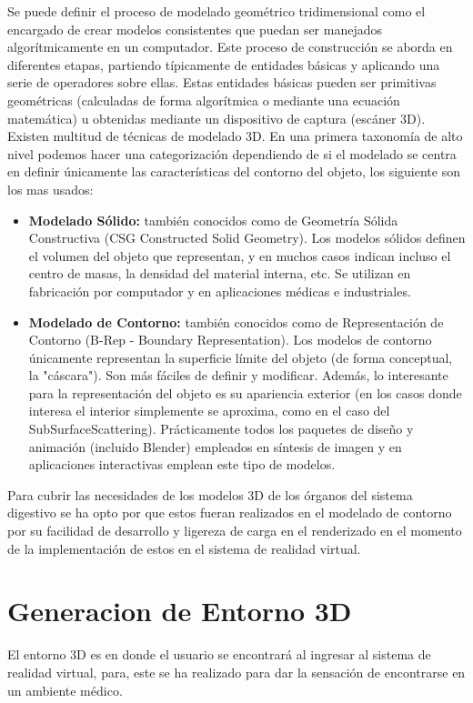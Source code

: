Se puede definir el proceso de modelado geométrico tridimensional como el encargado de crear modelos consistentes que puedan ser manejados algorítmicamente en un computador. Este proceso de construcción se aborda en diferentes etapas, partiendo típicamente de entidades básicas y aplicando una serie de operadores sobre ellas. Estas entidades básicas pueden ser primitivas geométricas (calculadas de forma algorítmica o mediante una ecuación matemática) u obtenidas mediante un dispositivo de captura (escáner 3D).\\

Existen multitud de técnicas de modelado 3D. En una primera taxonomía de alto nivel podemos hacer una categorización dependiendo de si el modelado se centra en definir únicamente las características del contorno del objeto, los siguiente son los mas usados:\\
\begin{itemize}
\item \textbf{Modelado Sólido:} también conocidos como de Geometría Sólida Constructiva (CSG Constructed Solid Geometry). Los modelos sólidos definen el volumen del objeto que representan, y en muchos casos indican incluso el centro de masas, la densidad del material interna, etc. Se utilizan en fabricación por computador y en aplicaciones médicas e industriales.
\item \textbf{Modelado de Contorno:} también conocidos como de Representación de Contorno (B-Rep - Boundary Representation). Los modelos de contorno únicamente representan la superficie límite del objeto (de forma conceptual, la "cáscara"). Son más fáciles de definir y modificar. Además, lo interesante para la representación del objeto es su apariencia exterior (en los casos donde interesa el interior simplemente se aproxima, como en el caso del SubSurfaceScattering). Prácticamente todos los paquetes de diseño y animación (incluido Blender) empleados en síntesis de imagen y en aplicaciones interactivas emplean este tipo de modelos.
\end{itemize}
Para  cubrir las necesidades de los modelos 3D de los órganos del sistema digestivo se ha opto por que estos fueran realizados en el modelado de contorno por su facilidad de desarrollo y ligereza de carga en el renderizado en el momento de la implementación de estos en el sistema de realidad virtual.\\

\section{Generacion de Entorno 3D}
El entorno 3D es en donde el usuario se encontrará al ingresar al sistema de realidad virtual, para, este se ha realizado para dar la sensación de encontrarse en un ambiente médico.\\

